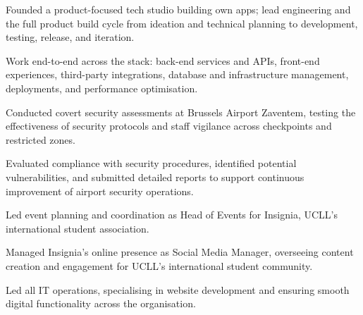 \begin{bullets}
    \item Founded a product-focused tech studio building own apps; lead engineering and the full product build cycle from ideation and technical planning to development, testing, release, and iteration.
    \item Work end-to-end across the stack: back-end services and APIs, front-end experiences, third-party integrations, database and infrastructure management, deployments, and performance optimisation.
\end{bullets}

\begin{bullets}
    \item Conducted covert security assessments at Brussels Airport Zaventem, testing the effectiveness of security protocols and staff vigilance across checkpoints and restricted zones.
    \item Evaluated compliance with security procedures, identified potential vulnerabilities, and submitted detailed reports to support continuous improvement of airport security operations.
\end{bullets}

\begin{bullets}
    \item Led event planning and coordination as Head of Events for Insignia, UCLL's international student association.
\end{bullets}
\begin{bullets}
    \item Managed Insignia's online presence as Social Media Manager, overseeing content creation and engagement for UCLL's international student community.
\end{bullets}


\begin{bullets}
    \item Led all IT operations, specialising in website development and ensuring smooth digital functionality across the organisation.
\end{bullets}

